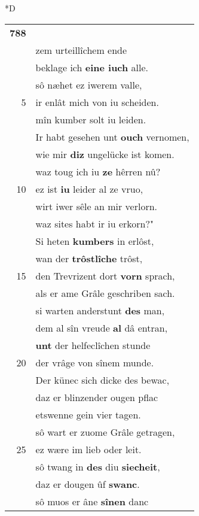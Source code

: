 \documentclass[8pt,a4paper,notitlepage]{article}
\begin{document}
\begin{table}[ht]
\begin{minipage}[t]{0.5\linewidth}
\small
\begin{center}*D
\end{center}
\begin{tabular}{rl}
\textbf{788} & \textit{\begin{large}I\end{large}}ch vreuden ellende,\\ 
 & zem urteillîchem ende\\ 
 & beklage ich \textbf{eine iuch} alle.\\ 
 & sô næhet ez iwerem valle,\\ 
5 & ir enlât mich von iu scheiden.\\ 
 & mîn kumber solt iu leiden.\\ 
 & Ir habt gesehen unt \textbf{ouch} vernomen,\\ 
 & wie mir \textbf{diz} ungelücke ist komen.\\ 
 & waz toug ich iu \textbf{ze} hêrren nû?\\ 
10 & ez ist \textbf{iu} leider al ze vruo,\\ 
 & wirt iwer sêle an mir verlorn.\\ 
 & waz sites habt ir iu erkorn?"\\ 
 & Si heten \textbf{kumbers} in erlôst,\\ 
 & wan der \textbf{trôstlîche} trôst,\\ 
15 & den Trevrizent dort \textbf{vorn} sprach,\\ 
 & als er ame Grâle geschriben sach.\\ 
 & si warten anderstunt \textbf{des} man,\\ 
 & dem al sîn vreude \textbf{al} dâ entran,\\ 
 & \textbf{unt} der helfeclîchen stunde\\ 
20 & der vrâge von sînem munde.\\ 
 & Der künec sich dicke des bewac,\\ 
 & daz er blinzender ougen pflac\\ 
 & etswenne gein vier tagen.\\ 
 & sô wart er zuome Grâle getragen,\\ 
25 & ez wære im lieb oder leit.\\ 
 & sô twang in \textbf{des} diu \textbf{siecheit},\\ 
 & daz er dougen ûf \textbf{swanc}.\\ 
 & sô muos er âne \textbf{sînen} danc\\ 

\end{tabular}
\end{minipage}
\end{table}
\end{document}
